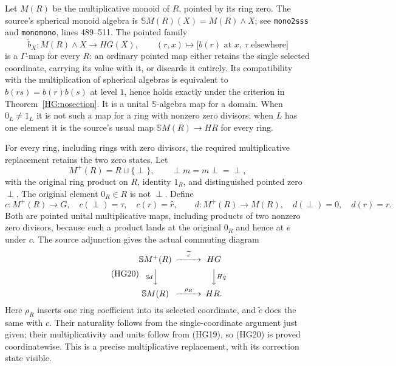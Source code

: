 Let $M(R)$ be the multiplicative monoid of $R$, pointed by its
ring zero.  The source's spherical monoid algebra is
$\mathbb S M(R)(X)=M(R)\wedge X$; see
\texttt{mono2sss} and \texttt{monomono}, lines 489--511.
The pointed family
\begin{equation}\tag{HG17}
 \widetilde b_X:M(R)\wedge X\to HG(X),\qquad
 (r,x)\longmapsto\bigl[\text{$b(r)$ at $x$, $\tau$ elsewhere}\bigr]
\end{equation}
is a $\Gamma$-map for every $R$: an ordinary pointed map either
retains the single selected coordinate, carrying its value with
it, or discards it entirely.  Its compatibility with the
multiplication of spherical algebras is equivalent to
$b(rs)=b(r)b(s)$ at level $1$, hence holds exactly under the
criterion in Theorem~\ref{HG:nosection}.  It is a unital
$\mathbb S$-algebra map for a domain.  When $0_L\ne1_L$
it is not such a map for a ring with nonzero zero divisors;
when $L$ has one element it is the source's usual map
$\mathbb S M(R)\to HR$ for every ring.

For every ring, including rings with zero divisors, the required
multiplicative replacement retains the two zero states.  Let
\begin{equation}\tag{HG18}
 M^+(R)=R\sqcup\{\perp\},\qquad
 \perp m=m\perp=\perp,
\end{equation}
with the original ring product on $R$, identity $1_R$, and
distinguished pointed zero $\perp$.  The original element
$0_R\in R$ is not $\perp$.  Define
\begin{equation}\tag{HG19}
 c:M^+(R)\to G,\quad c(\perp)=\tau,\quad c(r)=\widehat r,
 \qquad d:M^+(R)\to M(R),\quad d(\perp)=0,\quad d(r)=r.
\end{equation}
Both are pointed unital multiplicative maps, including products
of two nonzero zero divisors, because such a product lands at
the original $0_R$ and hence at $e$ under $c$.
The source adjunction gives the actual commuting diagram
\begin{equation}\tag{HG20}
 \begin{CD}
 \mathbb S M^+(R) @>{\widetilde c}>> HG\\
 @V{\mathbb S d}VV @VV{Hq}V\\
 \mathbb S M(R) @>{\rho_R}>> HR .
 \end{CD}
\end{equation}
Here $\rho_R$ inserts one ring coefficient into its selected
coordinate, and $\widetilde c$ does the same with $c$.  Their
naturality follows from the single-coordinate argument just
given; their multiplicativity and units follow from (HG19),
so (HG20) is proved coordinatewise.  This is a precise
multiplicative replacement, with its correction state visible.

